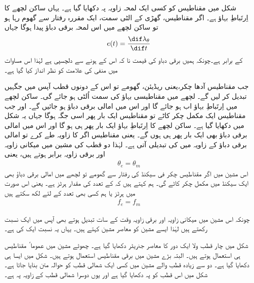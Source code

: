  شکل  میں مقناطیس کو کسی ایک لمحہ   زاویہ  پہ دکھایا گیا ہے۔ یہاں ساکن لچھے کا اِرتَباطِ بہاؤ  ہے۔ اگر مقناطیس، گھڑی کے الٹی سمت، ایک مقررہ رفتار  سے  گھوم رہا ہو تو ساکن لچھے میں اس لمحہ  برقی دباؤ پیدا ہوگا جہاں
\begin{align}
e(t)=\frac{\dif \lambda_\theta}{\dif t}
\end{align}
کے برابر ہے۔چونکہ ہمیں برقی دباو کی قیمت نا کہ اس کے  ہونے سے دلچسپی ہے لہٰذا اس مساوات میں منفی کی علامت کو نظر انداز کیا گیا ہے۔

جب مقناطیس آدھا چکر،یعنی  ریڈیئن،  گھومے تو اس کے دونوں  قطب آپس میں جگہیں تبدیل کر لیں گے۔ لچھے میں مقناطیسی بہاؤ کی سمت اُلٹی ہو جائے گی۔ ساکن لچھے میں اِرتَباطِ بہاؤ اب  ہو جائے گا اور اس میں امالی برقی دباؤ  ہو جائیں گے۔ اور جب مقناطیس ایک مکمل چکر کاٹے تو مقناطیس  ایک بار پھر اسی جگہ ہوگا جہاں یہ شکل میں دکھایا گیا ہے۔ ساکن لچھے کا اِرتَباطِ بہاؤ ایک بار پھر  ہی ہو گا اور اس میں امالی برقی دباؤ بھی ایک بار پھر  ہی ہوں گے۔ یعنی مقناطیس اگر  کا زاویہ طے کرے تو امالی برقی دباؤ کے زاویہ میں  کی تبدیلی آتی ہے۔ لہٰذا دو قطب کی مشین میں میکانی زاویہ  اور برقی زاویہ  برابر ہوتے ہیں، یعنی
\begin{align*}
\theta_e=\theta_m
\end{align*}
اس مشین میں اگر مقناطیس  چکر فی سیکنڈ کی رفتار سے گھومے تو لچھے میں امالی برقی دباؤ  بھی ایک سیکنڈ میں  مکمل چکر کاٹے گی۔ ہم کہتے ہیں کہ  کے تعدد    کی مقدار   ہرٹز ہے۔ یعنی اس صورت میں   ہرٹز  یا ہم کسی بھی تعدد کے لئے لکھ سکتے ہیں
\begin{align*}
f_e=f_m
\end{align*}

چونکہ اس مشین میں  میکانی زاویہ  اور برقی زاویہ  وقت کے سات تبدیل ہوتے بھی آپس میں ایک نسبت رکھتے ہیں لہٰذا ایسے مشین کو معاصر مشین  کہتے ہیں۔ یہاں یہ نسبت ایک کی ہے۔ 

شکل  میں چار قطب ولا ایک دور کا معاصر جنریٹر دکھایا گیا ہے۔ چھوٹے مشین میں عموما ً مقناطیس ہی استعمال ہوتے ہیں۔ البتہ بڑے مشین میں برقی مقناطیس استعمال ہوتے ہیں۔ شکل  میں ایسا ہی دکھایا گیا ہے۔ دو سے زیادہ قطب والے مشین میں کسی ایک شمالی قطب کو حوالہ متن بنایا جاتا ہے۔ شکل میں اس قطب کو  پہ دکھایا گیا ہے اور یوں دوسرا شمالی قطب  کے زاویہ پہ ہے۔

